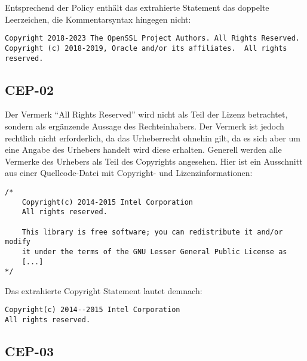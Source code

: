 Entsprechend der Policy enthält das extrahierte Statement das doppelte Leerzeichen, die Kommentarsyntax hingegen nicht:
\begin{lstlisting}[numbers=none, keepspaces=true]
Copyright 2018-2023 The OpenSSL Project Authors. All Rights Reserved.
Copyright (c) 2018-2019, Oracle and/or its affiliates.  All rights reserved.
\end{lstlisting}



\subsection{CEP-02}\label{subsec:cep-02}

Der Vermerk \enquote{All Rights Reserved} wird nicht als Teil der Lizenz betrachtet, sondern als ergänzende Aussage des Rechteinhabers.
Der Vermerk ist jedoch rechtlich nicht erforderlich, da das Urheberrecht ohnehin gilt, da es sich aber um eine Angabe des Urhebers handelt wird diese erhalten.
Generell werden alle Vermerke des Urhebers als Teil des Copyrights angesehen.
Hier ist ein Ausschnitt aus einer Quellcode-Datei mit Copyright- und Lizenzinformationen:

\begin{lstlisting}[numbers=none, keepspaces=true]
/*
    Copyright(c) 2014-2015 Intel Corporation
    All rights reserved.

    This library is free software; you can redistribute it and/or modify
    it under the terms of the GNU Lesser General Public License as
    [...]
*/
\end{lstlisting}

Das extrahierte Copyright Statement lautet demnach:

\begin{lstlisting}[numbers=none, keepspaces=true]
Copyright(c) 2014--2015 Intel Corporation
All rights reserved.
\end{lstlisting}


\subsection{CEP-03}\label{subsec:cep-03}


